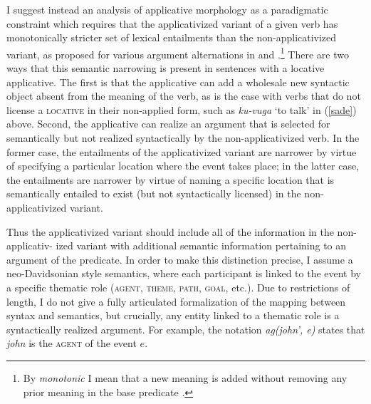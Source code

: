 \documentclass[output=paper]{langsci/langscibook}
\begin{document}
I suggest instead an analysis of applicative morphology as a paradigmatic constraint which requires that the applicativized variant of a given verb has monotonically stricter set of lexical entailments than the non-applicativized variant, as proposed for various argument alternations in \citet{ackermanmoore:2001} and \citet{beavers:2010b}.\footnote{By \emph{monotonic} I mean that a new meaning is added without removing any prior meaning in the base predicate \citep{akg:2007, akg:2012}.} There are two ways that this semantic narrowing is present in sentences with a locative applicative. The first is that the applicative can add a wholesale new syntactic object absent from the meaning of the verb, as is the case with verbs that do not license a {\scshape locative} in their non-applied form, such as \emph{ku-vuga} `to talk'  in (\ref{sade}) above. Second, the applicative can realize an argument that is selected for semantically but not realized syntactically by the non-applicativized verb. In the former case, the entailments of the applicativized variant are narrower by virtue of specifying a particular location where the event takes place; in the latter case, the entailments are narrower by virtue of naming a specific location that is semantically entailed to exist (but not syntactically licensed) in the non-applicativized variant. 
 
 Thus the applicativized variant should include all of the information in the non-applicativ- ized variant with additional semantic information pertaining to an argument of the predicate. In order to make this distinction precise, I assume a neo-Davidsonian style semantics, where each participant is linked to the event by a specific thematic role ({\scshape agent, theme, path, goal,} etc.). Due to restrictions of length, I do not give a fully articulated formalization of the mapping between syntax and semantics, but crucially, any entity linked to a thematic role is a syntactically realized argument. For example, the notation \emph{ag(john', e)} states that  \emph{john} is the {\scshape agent} of the event $e$.
	 
\end{document}
